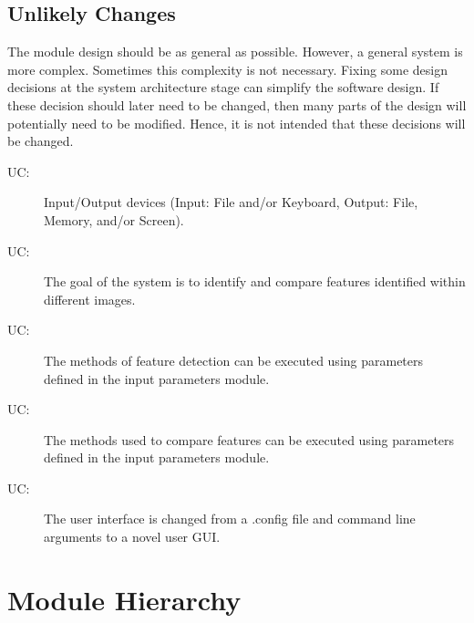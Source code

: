 \documentclass[12pt, titlepage]{article}
\newcounter{ucnum}
\newcommand{\uctheucnum}{UC\theucnum}
\begin{document}
\subsection{Unlikely Changes} \label{SecUchange}

The module design should be as general as possible. However, a general system is
more complex. Sometimes this complexity is not necessary. Fixing some design
decisions at the system architecture stage can simplify the software design. If
these decision should later need to be changed, then many parts of the design
will potentially need to be modified. Hence, it is not intended that these
decisions will be changed.

\begin{description}
\item[ \uctheucnum \label{ucIO}:] Input/Output devices
  (Input: File and/or Keyboard, Output: File, Memory, and/or Screen).
\item[ \uctheucnum \label{ucGoal}:]  The goal of the system 
is to identify and compare features identified within different images.
\item[ \uctheucnum \label{ucDetectMethod}:]  The methods of 
feature detection can be executed using parameters defined in the input parameters 
module.
\item[ \uctheucnum \label{ucMatchMethod}:]  The methods used 
to compare features can be executed using parameters defined in the input parameters 
module.
\item[ \uctheucnum \label{ucConfig}:]  The user interface is 
changed from a .config file and command line arguments to a novel user GUI.
  
\end{description}

\section{Module Hierarchy} \label{SecMH}
\end{document}
